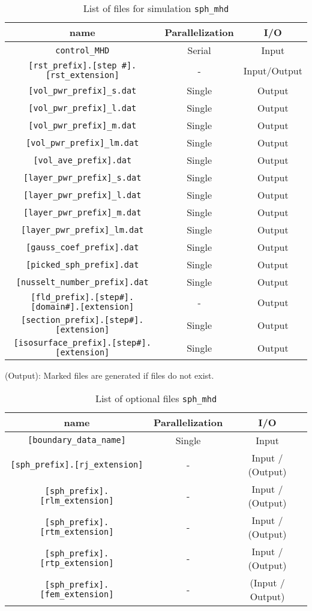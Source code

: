 \begin{table}[htp]
\caption{List of files for simulation {\tt sph\_mhd} }
\begin{center} 
\begin{tabular}{|c|c|c|}
\hline
 name & Parallelization & I/O \\ \hline \hline
\verb|control_MHD| & Serial & Input \\ \hline
\verb|[rst_prefix].[step #].[rst_extension]| &  - & Input/Output  \\ \hline
\verb|[vol_pwr_prefix]_s.dat| & Single & Output \\ \hline
\verb|[vol_pwr_prefix]_l.dat| & Single & Output \\
\verb|[vol_pwr_prefix]_m.dat| & Single & Output \\
\verb|[vol_pwr_prefix]_lm.dat| & Single & Output \\
\verb|[vol_ave_prefix].dat| & Single & Output \\ \hline
\verb|[layer_pwr_prefix]_s.dat| & Single & Output \\
\verb|[layer_pwr_prefix]_l.dat| & Single & Output \\
\verb|[layer_pwr_prefix]_m.dat| & Single & Output \\
\verb|[layer_pwr_prefix]_lm.dat| & Single & Output \\ \hline
\verb|[gauss_coef_prefix].dat| & Single & Output   \\
\verb|[picked_sph_prefix].dat| & Single & Output   \\ \hline
\verb|[nusselt_number_prefix].dat| & Single & Output   \\ \hline
\verb|[fld_prefix].[step#].[domain#].[extension]| &  - & Output  \\ \hline
\verb|[section_prefix].[step#].[extension]| &  Single & Output  \\
\verb|[isosurface_prefix].[step#].[extension]| &  Single & Output  \\ \hline
\end{tabular}
\end{center}
(Output): Marked files are generated if files do not exist.
\label{table:sph_mhd}
\end{table}
%
%
\begin{table}[htp]
\caption{List of optional files {\tt sph\_mhd} }
\begin{center} 
\begin{tabular}{|c|c|c|}
\hline
 name & Parallelization & I/O \\ \hline \hline
\verb|[boundary_data_name]| & Single & Input \\ \hline
\verb|[sph_prefix].[rj_extension]|  & - & Input / (Output) \\
\verb|[sph_prefix].[rlm_extension]| & - & Input / (Output) \\
\verb|[sph_prefix].[rtm_extension]| & - & Input / (Output) \\
\verb|[sph_prefix].[rtp_extension]| & - & Input / (Output) \\ \hline
\verb|[sph_prefix].[fem_extension]| & - & (Input / Output) \\ \hline
\end{tabular}
\end{center}
\label{table:sph_mhd_optional}
\end{table}
